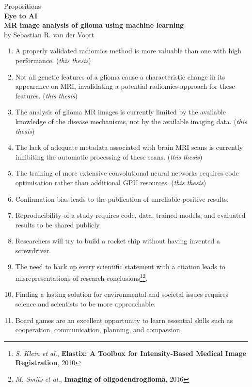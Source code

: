 \documentclass{article}
\begin{document}
\thispagestyle{empty}
\begin{centering}
{\Large Propositions}\\
\vspace{2em}
\textbf{\LARGE Eye to AI}\\
\textbf{\LARGE MR image analysis of glioma using machine learning}\\
\vspace{2em}
{\large by Sebastian R. van der Voort}\\
\end{centering}
\vspace{5em}
\begin{enumerate}
    \item A properly validated radiomics method is more valuable than one with high performance. (\textit{this thesis})
    \item Not all genetic features of a glioma cause a characteristic change in its appearance on MRI, invalidating a potential radiomics approach for these features. (\textit{this thesis})
    \item The analysis of glioma MR images is currently limited by the available knowledge of the disease mechanisms, not by the available imaging data. (\textit{this thesis})
    \item The lack of adequate metadata associated with brain MRI scans is currently inhibiting the automatic processing of these scans. (\textit{this thesis})
    \item The training of more extensive convolutional neural networks requires code optimisation rather than additional GPU resources. (\textit{this thesis})
    \item Confirmation bias leads to the publication of unreliable positive results.
    \item Reproducibility of a study requires code, data, trained models, and evaluated results to be shared publicly.
    \item Researchers will try to build a rocket ship without having invented a screwdriver.
    \item The need to back up every scientific statement with a citation leads to misrepresentations of research conclusions\footnote{\textit{S. Klein et al.}, \textbf{Elastix: A Toolbox for Intensity-Based Medical Image Registration}, 2010}\footnote{\textit{M. Smits et al.}, \textbf{Imaging of oligodendroglioma}, 2016}.
    \item Finding a lasting solution for environmental and societal issues requires science and scientists to be more approachable.
    \item Board games are an excellent opportunity to learn essential skills such as cooperation, communication, planning, and compassion.
\end{enumerate}
\end{document}
